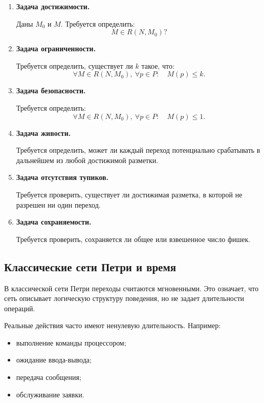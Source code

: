 \documentclass[12pt,a4paper]{article}
\begin{document}
\begin{enumerate}
    \item \textbf{Задача достижимости.}

    Даны $M_0$ и $M$. Требуется определить:
    \[
    M \in R(N,M_0)?
    \]

    \item \textbf{Задача ограниченности.}

    Требуется определить, существует ли $k$ такое, что:
    \[
    \forall M \in R(N,M_0),\ \forall p\in P:
    \quad
    M(p)\le k.
    \]

    \item \textbf{Задача безопасности.}

    Требуется определить:
    \[
    \forall M \in R(N,M_0),\ \forall p\in P:
    \quad
    M(p)\le 1.
    \]

    \item \textbf{Задача живости.}

    Требуется определить, может ли каждый переход потенциально срабатывать в дальнейшем из любой достижимой разметки.

    \item \textbf{Задача отсутствия тупиков.}

    Требуется проверить, существует ли достижимая разметка, в которой не разрешен ни один переход.

    \item \textbf{Задача сохраняемости.}

    Требуется проверить, сохраняется ли общее или взвешенное число фишек.
\end{enumerate}

\subsection{Классические сети Петри и время}

В классической сети Петри переходы считаются мгновенными. Это означает, что сеть описывает логическую структуру поведения, но не задает длительности операций.

Реальные действия часто имеют ненулевую длительность. Например:
\begin{itemize}
    \item выполнение команды процессором;
    \item ожидание ввода-вывода;
    \item передача сообщения;
    \item обслуживание заявки.
\end{itemize}
\end{document}

